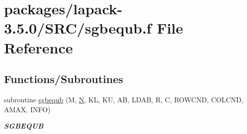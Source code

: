 \hypertarget{sgbequb_8f}{}\section{packages/lapack-\/3.5.0/\+S\+R\+C/sgbequb.f File Reference}
\label{sgbequb_8f}
\subsection*{Functions/\+Subroutines}
\begin{DoxyCompactItemize}
\item 
subroutine \hyperlink{group__realGBcomputational_ga8c2e30003a6a88fdf225cdd5fddc2a28}{sgbequb} (M, \hyperlink{polmisc_8c_a0240ac851181b84ac374872dc5434ee4}{N}, K\+L, K\+U, A\+B, L\+D\+A\+B, R, C, R\+O\+W\+C\+N\+D, C\+O\+L\+C\+N\+D, A\+M\+A\+X, I\+N\+F\+O)
\begin{DoxyCompactList}\small\item\em {\bfseries S\+G\+B\+E\+Q\+U\+B} \end{DoxyCompactList}\end{DoxyCompactItemize}
